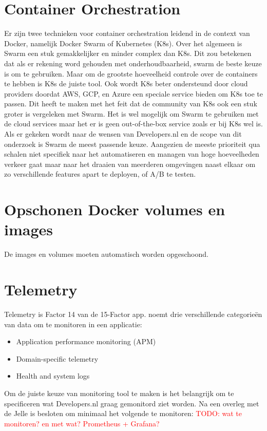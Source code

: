 \section{Container Orchestration}
Er zijn twee technieken voor container orchestration leidend in de context van Docker, namelijk Docker Swarm of Kubernetes (K8s). Over het algemeen is Swarm een stuk gemakkelijker en minder complex dan K8s. Dit zou betekenen dat als er rekening word gehouden met onderhoudbaarheid, swarm de beste keuze is om te gebruiken. Maar om de grootste hoeveelheid controle over de containers te hebben is K8s de juiste tool. Ook wordt K8s beter ondersteund door cloud providers doordat AWS, GCP, en Azure een speciale service bieden om K8s toe te passen. Dit heeft te maken met het feit dat de community van K8s ook een stuk groter is vergeleken met Swarm. Het is wel mogelijk om Swarm te gebruiken met de cloud services maar het er is geen out-of-the-box service zoals er bij K8s wel is. Als er gekeken wordt naar de wensen van Developers.nl en de scope van dit onderzoek is Swarm de meest passende keuze. Aangezien de meeste prioriteit qua schalen niet specifiek naar het automatiseren en managen van hoge hoeveelheden verkeer gaat maar naar het draaien van meerderen omgevingen naast elkaar om zo verschillende features apart te deployen, of A/B te testen.

\section{Opschonen Docker volumes en images}
De images en volumes moeten automatisch worden opgeschoond.

\section{Telemetry}
Telemetry is Factor 14 van de 15-Factor app. \parencite{Beyond12Factor} noemt drie verschillende categorieën van data om te monitoren in een applicatie:
\begin{itemize}
	\item Application performance monitoring (APM)
	\item Domain-specific telemetry
	\item Health and system logs
\end{itemize}

Om de juiste keuze van monitoring tool te maken is het belangrijk om te specificeren wat Developers.nl graag gemonitord ziet worden. Na een overleg met de Jelle is besloten om minimaal het volgende te monitoren:
\textcolor{red}{TODO: wat te monitoren? en met wat? Prometheus + Grafana?} %

